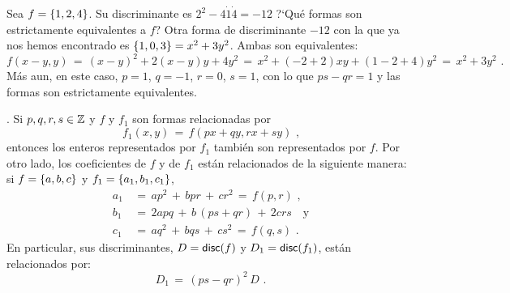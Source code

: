 \begin{ejemDefiniciones}\label{ejem:definiciones:equivalencia:traslacion}
	Sea $f=\left\{1,2,4\right\}$. Su discriminante es
	$2^2-4\dot 1\dot 4=-12$
	?`Qu\'e formas son estrictamente equivalentes a $f$?
	Otra forma de discriminante $-12$ con la que ya nos hemos
	encontrado es $\left\{1,0,3\right\}=x^2+3y^2$.
	Ambas son equivalentes:
	\begin{displaymath}
		f(x-y,y)\,=\,(x-y)^2+2(x-y)y+4y^2\,=\,
			x^2+(-2+2)xy+(1-2+4)y^2\,=\,
			x^2+3y^2
		\text{ .}
	\end{displaymath}
	M\'as aun, en este caso, $p=1$, $q=-1$, $r=0$, $s=1$,
	con lo que $ps-qr=1$ y las formas son estrictamente
	equivalentes.
\end{ejemDefiniciones}

\begin{obsDefiniciones}\label{obs:definiciones:equivalencia:invariantes}
	\quedacomoejercicio.
	Si $p,q,r,s\in\mathbb{Z}$ y $f$ y $f_1$ son formas relacionadas por
	\begin{equation}
		\label{eq:definiciones:equivalencia:cambio}
		f_1(x,y)\,=\,f(px+qy,rx+sy)
		\text{ ,}
	\end{equation}
	entonces los enteros representados por $f_1$ tambi\'en son
	representados por $f$.
	Por otro lado, los coeficientes de $f$ y de $f_1$ est\'an
	relacionados de la siguiente manera:
	si $f=\left\{a,b,c\right\}$ y $f_1=\left\{a_1,b_1,c_1\right\}$,
	\begin{equation}
		\label{eq:definiciones:equivalencia:coeficientes}
		\begin{aligned}
			a_1 & \,=\, ap^2\,+\,bpr\,+\,cr^2\,=\,f(p,r)
				\text{ ,} \\
			b_1 & \,=\, 2apq\,+\,b\,(ps+qr)\,+\,2crs
				\quad\text{y} \\
			c_1 & \,=\, aq^2\,+\,bqs\,+\,cs^2\,=\,f(q,s)
				\text{ .}
		\end{aligned}
	\end{equation}
	En particular, sus discriminantes, $D=\mathsf{disc}(f)$ y
	$D_1=\mathsf{disc}(f_1)$, est\'an relacionados por:
	\begin{equation}
		\label{eq:definiciones:equivalencia:discriminantes}
		D_1\,=\,(ps-qr)^2\,D
		\text{ .}
	\end{equation}
\end{obsDefiniciones}

